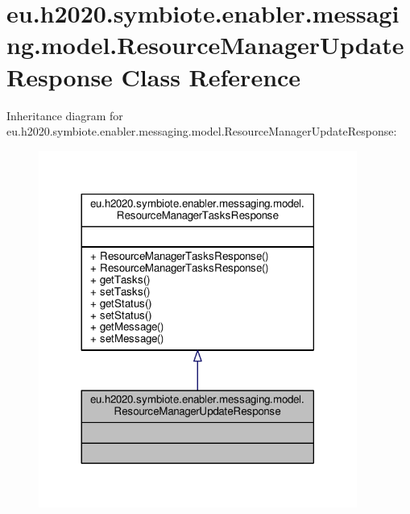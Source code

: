 \hypertarget{classeu_1_1h2020_1_1symbiote_1_1enabler_1_1messaging_1_1model_1_1ResourceManagerUpdateResponse}{}\section{eu.\+h2020.\+symbiote.\+enabler.\+messaging.\+model.\+Resource\+Manager\+Update\+Response Class Reference}
\label{classeu_1_1h2020_1_1symbiote_1_1enabler_1_1messaging_1_1model_1_1ResourceManagerUpdateResponse}


Inheritance diagram for eu.\+h2020.\+symbiote.\+enabler.\+messaging.\+model.\+Resource\+Manager\+Update\+Response\+:
\nopagebreak
\begin{figure}[H]
\begin{center}
\leavevmode
\includegraphics[width=296pt]{classeu_1_1h2020_1_1symbiote_1_1enabler_1_1messaging_1_1model_1_1ResourceManagerUpdateResponse__inherit__graph}
\end{center}
\end{figure}


